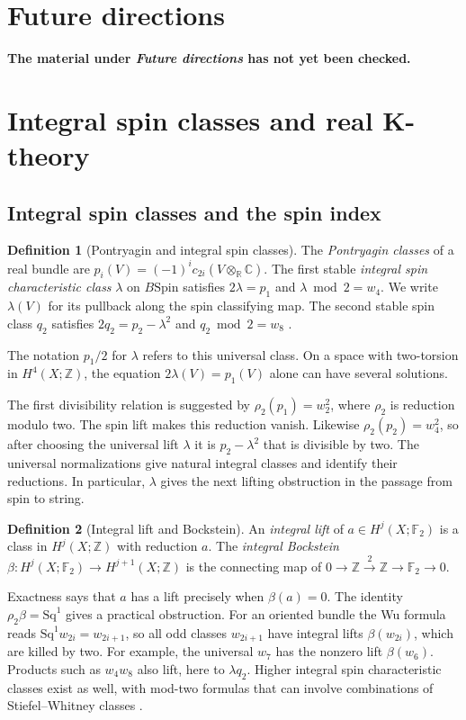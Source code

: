 \documentclass[11pt]{article}
\theoremstyle{definition}
\newtheorem{defn}{Definition}[section]
\newcommand{\F}{\mathbb F}
\newcommand{\Z}{\mathbb Z}
\newcommand{\Spin}{\mathrm{Spin}}
\begin{document}
\clearpage
\section*{Future directions}

\noindent\textbf{The material under \emph{Future directions} has not yet been checked.}\par

\section{Integral spin classes and real K-theory}
\subsection{Integral spin classes and the spin index}\label{sec:integral-spin}
\begin{defn}[Pontryagin and integral spin classes]
The \emph{Pontryagin classes} of a real bundle are \(p_i(V)=(-1)^ic_{2i}(V\otimes_{\mathbb R}\mathbb C)\). The first stable \emph{integral spin characteristic class} \(\lambda\) on \(B\Spin\) satisfies \(2\lambda=p_1\) and \(\lambda\bmod 2=w_4\). We write \(\lambda(V)\) for its pullback along the spin classifying map. The second stable spin class \(q_2\) satisfies \(2q_2=p_2-\lambda^2\) and \(q_2\bmod 2=w_8\) \cite{FH}.
\end{defn}
The notation \(p_1/2\) for \(\lambda\) refers to this universal class. On a space with two-torsion in \(H^4(X;\Z)\), the equation \(2\lambda(V)=p_1(V)\) alone can have several solutions.

The first divisibility relation is suggested by \(\rho_2(p_1)=w_2^2\), where \(\rho_2\) is reduction modulo two. The spin lift makes this reduction vanish. Likewise \(\rho_2(p_2)=w_4^2\), so after choosing the universal lift \(\lambda\) it is \(p_2-\lambda^2\) that is divisible by two. The universal normalizations give natural integral classes and identify their reductions. In particular, \(\lambda\) gives the next lifting obstruction in the passage from spin to string.

\begin{defn}[Integral lift and Bockstein]
An \emph{integral lift} of \(a\in H^j(X;\F_2)\) is a class in \(H^j(X;\Z)\) with reduction \(a\). The \emph{integral Bockstein} \(\beta:H^j(X;\F_2)\to H^{j+1}(X;\Z)\) is the connecting map of \(0\to\Z\xrightarrow{2}\Z\to\F_2\to0\).
\end{defn}
Exactness says that \(a\) has a lift precisely when \(\beta(a)=0\). The identity \(\rho_2\beta=\mathrm{Sq}^1\) gives a practical obstruction. For an oriented bundle the Wu formula reads \(\mathrm{Sq}^1w_{2i}=w_{2i+1}\), so all odd classes \(w_{2i+1}\) have integral lifts \(\beta(w_{2i})\), which are killed by two. For example, the universal \(w_7\) has the nonzero lift \(\beta(w_6)\). Products such as \(w_4w_8\) also lift, here to \(\lambda q_2\). Higher integral spin characteristic classes exist as well, with mod-two formulas that can involve combinations of Stiefel--Whitney classes \cite{Duan}.
\end{document}
